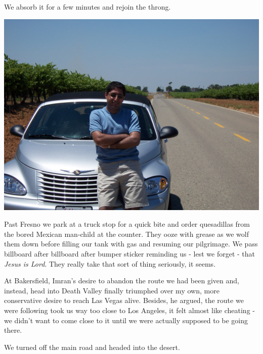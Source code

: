 \documentclass[a5paper,titlepage,11pt,draft]{book}
\begin{document}
We absorb it for a few minutes and rejoin the throng.

\begin{center}\includegraphics[width=\textwidth]{gfx/100_1307}\end{center}

Past Fresno we park at a truck stop for a quick bite and order quesadillas from the bored Mexican man-child at the counter.  They ooze with grease as we wolf them down before filling our tank with gas and resuming our pilgrimage.  We pass billboard after billboard after bumper sticker reminding us - lest we forget - that \emph{Jesus is Lord}.  They really take that sort of thing seriously, it seems.

At Bakersfield, Imran's desire to abandon the route we had been given and, instead, head into Death Valley finally triumphed over my own, more conservative desire to reach Las Vegas alive.  Besides, he argued, the route we were following took us way too close to Los Angeles, it felt almost like cheating - we didn't want to come close to it until we were actually supposed to be going there.

We turned off the main road and headed into the desert.
\end{document}

